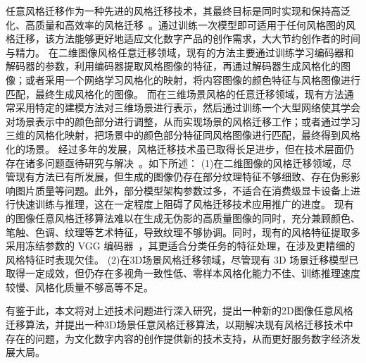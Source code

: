 \par 任意风格迁移作为一种先进的风格迁移技术，其最终目标是同时实现和保持高泛化、高质量和高效率的风格迁移~\cite{park2019arbitrary}。通过训练一次模型即可适用于任何风格图的风格迁移，该方法能够更好地适应文化数字产品的创作需求，大大节约创作者的时间与精力。
在二维图像风格任意迁移领域，现有的方法主要通过训练学习编码器和解码器的参数，利用编码器提取风格图像的特征，再通过解码器生成风格化的图像；或者采用一个网络学习风格化的映射，将内容图像的颜色特征与风格图像进行匹配，最终生成风格化的图像。
而在三维场景风格的任意迁移领域，现有方法通常采用特定的建模方法对三维场景进行表示，然后通过训练一个大型网络使其学会对场景表示中的颜色部分进行调整，从而实现场景的风格迁移工作；或者通过学习三维的风格化映射，把场景中的颜色部分特征同风格图像进行匹配，最终得到风格化的场景。
\newline \indent
经过多年的发展，风格迁移技术虽已取得长足进步，但在技术层面仍存在诸多问题亟待研究与解决~\cite{jing2019neural}。如下所述：
\newline \indent
(1)在二维图像的风格迁移领域，尽管现有方法已有所发展，但生成的图像仍存在部分纹理特征不够细致、存在伪影影响图片质量等问题。此外，部分模型架构参数过多，不适合在消费级显卡设备上进行快速训练与推理，这在一定程度上阻碍了风格迁移技术应用推广的进度。
现有的图像任意风格迁移算法难以在生成无伪影的高质量图像的同时，充分兼顾颜色、笔触、色调、纹理等艺术特征，导致纹理不够协调。同时，现有的风格特征提取多采用冻结参数的 VGG 编码器~\cite{simonyan2015very}，其更适合分类任务的特征处理，在涉及更精细的风格特征时表现欠佳。
\newline \indent
(2)在3D场景风格迁移领域，尽管现有 3D 场景迁移模型已取得一定成效，但仍存在多视角一致性低、零样本风格化能力不佳、训练推理速度较慢、风格化质量不够高等不足。
\par 有鉴于此，本文将对上述技术问题进行深入研究，提出一种新的2D图像任意风格迁移算法，并提出一种3D场景任意风格迁移算法，以期解决现有风格迁移技术中存在的问题，为文化数字内容的创作提供新的技术支持，从而更好服务数字经济发展大局。




